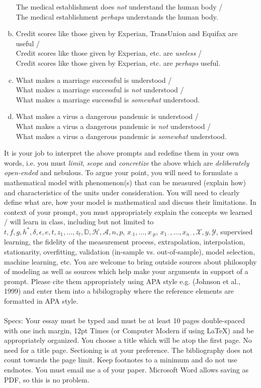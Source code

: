 \documentclass[12pt]{article}
\begin{document}
\begin{enumerate}[(a)]
The medical establishment does \textit{not} understand the human body / \\
The medical establishment \textit{perhaps} understands the human body.
\item Credit scores like those given by Experian, TransUnion and Equifax are useful / \\
Credit scores like those given by Experian, etc. are \textit{useless} / \\
Credit scores like those given by Experian, etc. are \textit{perhaps} useful.
\item What makes a marriage successful is understood / \\
What makes a marriage successful is \emph{not} understood / \\
What makes a marriage successful is \emph{somewhat} understood.
\item What makes a virus a dangerous pandemic is understood / \\
What makes a virus a dangerous pandemic is \emph{not} understood / \\
What makes a virus a dangerous pandemic is \emph{somewhat} understood.
\end{enumerate}

\noindent It is your job to interpret the above prompts and redefine them in your own words, i.e. you must \textit{limit}, \textit{scope} and \textit{concretize} the above which are \textit{deliberately open-ended} and nebulous. To argue your point, you will need to formulate a mathematical model with phenomenon(s) that can be measured (explain how) and characteristics of the units under consideration. You will need to clearly define what  are, how your model is mathematical and discuss their limitations. In context of your prompt, you must appropriately explain the concepts we learned / will learn in class, including but not limited to $t ,f, g, h^*, \delta, \epsilon, e, t, z_1, \ldots, z_t, \mathbb{D}, \mathcal{H}, \mathcal{A}, n, p$, $x_{\cdot 1}, \ldots, x_{\cdot p}$, $x_{1 \cdot}, \ldots, x_{n \cdot}, \mathcal{X}, y, \mathcal{Y}$, supervised learning, the fidelity of the measurement process, extrapolation, interpolation, stationarity, overfitting, validation (in-sample vs. out-of-sample), model selection, machine learning, etc. You are welcome to bring outside sources about philosophy of modeling as well as sources which help make your arguments in support of a prompt. Please cite them appropriately using APA style e.g. (Johnson et al., 1999) and enter them into a bibilography where the reference elements are formatted in APA style.\\
~\\
Specs: Your essay must be typed and must be at least 10 pages double-spaced with one inch margin, 12pt Times (or Computer Modern if using \LaTeX) and be appropriately organized. You choose a title which will be atop the first page. No need for a title page. Sectioning is at your preference. The bibliography does not count towards the page limit. Keep footnotes to a minimum and do not use endnotes. You must email me a   of your paper. Microsoft Word allows saving as PDF, so this is no problem.

\end{document}
